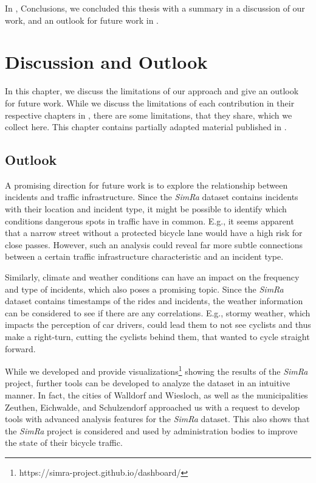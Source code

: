 In , Conclusions, we concluded this thesis with a summary in  a discussion of our work, and an outlook for future work in .
\chapter{Discussion and Outlook}
\label{cha:discussion_and_outlook}
In this chapter, we discuss the limitations of our approach and give an outlook for future work.
While we discuss the limitations of each contribution in their respective chapters in , there are some limitations, that they share, which we collect here.
This chapter contains partially adapted material published in \cite{karakaya2020simra,karakaya2022cyclesense,karakaya2022realistic,karakaya2023achieving,karakaya2023crowdsensing}.

\section{Outlook}
\label{sec:outlook}
A promising direction for future work is to explore the relationship between incidents and traffic infrastructure.
Since the \textit{SimRa} dataset contains incidents with their location and incident type, it might be possible to identify which conditions dangerous spots in traffic have in common.
E.g., it seems apparent that a narrow street without a protected bicycle lane would have a high risk for close passes.
However, such an analysis could reveal far more subtle connections between a certain traffic infrastructure characteristic and an incident type.

Similarly, climate and weather conditions can have an impact on the frequency and type of incidents, which also poses a promising topic.
Since the \textit{SimRa} dataset contains timestamps of the rides and incidents, the weather information can be considered to see if there are any correlations.
E.g., stormy weather, which impacts the perception of car drivers, could lead them to not see cyclists and thus make a right-turn, cutting the cyclists behind them, that wanted to cycle straight forward.

While we developed and provide visualizations\footnote{https://simra-project.github.io/dashboard/} showing the results of the \textit{SimRa} project, further tools can be developed to analyze the dataset in an intuitive manner.
In fact, the cities of Walldorf and Wiesloch, as well as the municipalities Zeuthen, Eichwalde, and Schulzendorf approached us with a request to develop tools with advanced analysis features for the \textit{SimRa} dataset.
This also shows that the \textit{SimRa} project is considered and used by administration bodies to improve the state of their bicycle traffic.
 
